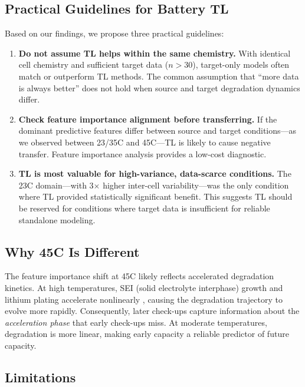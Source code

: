 \documentclass[review]{elsarticle}
\begin{document}
\subsection{Practical Guidelines for Battery TL}

Based on our findings, we propose three practical guidelines:

\begin{enumerate}
    \item \textbf{Do not assume TL helps within the same chemistry.} With identical cell chemistry and sufficient target data ($n > 30$), target-only models often match or outperform TL methods. The common assumption that ``more data is always better'' does not hold when source and target degradation dynamics differ.
    \item \textbf{Check feature importance alignment before transferring.} If the dominant predictive features differ between source and target conditions---as we observed between 23/35\textdegree C and 45\textdegree C---TL is likely to cause negative transfer. Feature importance analysis provides a low-cost diagnostic.
    \item \textbf{TL is most valuable for high-variance, data-scarce conditions.} The 23\textdegree C domain---with 3$\times$ higher inter-cell variability---was the only condition where TL provided statistically significant benefit. This suggests TL should be reserved for conditions where target data is insufficient for reliable standalone modeling.
\end{enumerate}

\subsection{Why 45\textdegree C Is Different}

The feature importance shift at 45\textdegree C likely reflects accelerated degradation kinetics. At high temperatures, SEI (solid electrolyte interphase) growth and lithium plating accelerate nonlinearly \cite{birkl2017degradation}, causing the degradation trajectory to evolve more rapidly. Consequently, later check-ups capture information about the \textit{acceleration phase} that early check-ups miss. At moderate temperatures, degradation is more linear, making early capacity a reliable predictor of future capacity.

\subsection{Limitations}
\end{document}

